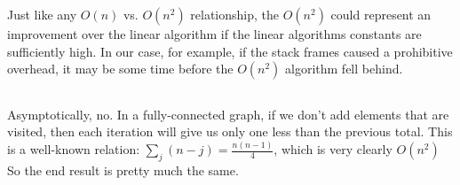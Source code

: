 \documentclass[a4paper]{article}
\begin{document}
Just like any $O(n)$ vs. $O(n^2)$ relationship, the $O(n^2)$ could represent an improvement over the linear algorithm if the linear algorithms constants are sufficiently high. In our case, for example, if the stack frames caused a prohibitive overhead, it may be some time before the $O(n^2)$ algorithm fell behind.

\subsection{}

Asymptotically, no. In a fully-connected graph, if we don't add elements that are visited, then each iteration will give us only one less than the previous total. This is a well-known relation: $\sum_{j} (n-j) = \frac{n(n-1)}{4}$, which is very clearly $O(n^2)$ So the end result is pretty much the same.
\end{document}
